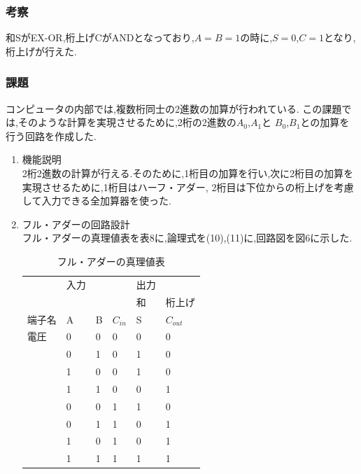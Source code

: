 \documentclass[twocolumn, 10pt,a4j]{jsarticle}
\begin{document}
  \subsubsection{考察}
    和SがEX-OR,桁上げCがANDとなっており,$A=B=1$の時に,$S=0$,$C=1$となり,
    桁上げが行えた.
  \subsubsection{課題}
    コンピュータの内部では,複数桁同士の2進数の加算が行われている.
    この課題では,そのような計算を実現させるために,2桁の2進数の$A_{0}$,$A_{1}$と
    $B_{0}$,$B_{1}$との加算を行う回路を作成した.
    \begin{enumerate}
    \item 機能説明 \\
      2桁2進数の計算が行える.そのために,1桁目の加算を行い,次に2桁目の加算を実現させるために,1桁目はハーフ・アダー,
      2桁目は下位からの桁上げを考慮して入力できる全加算器を使った.
    \item フル・アダーの回路設計 \\
      フル・アダーの真理値表を表8に,論理式を(10),(11)に,回路図を図6に示した.
      \begin{table}[H]
        \centering
        \caption{フル・アダーの真理値表}
        \label{my-label}
        \footnotesize
        \begin{tabular}{l|lll|ll}
            & 入力 &   &          & 出力 &           \\ \cline{5-6} 
            &    &   &          & 和  & 桁上げ       \\ \hline
        端子名 & A  & B & $C_{in}$ & S  & $C_{out}$ \\ \hline
        電圧  & 0  & 0 & 0        & 0  & 0         \\
            & 0  & 1 & 0        & 1  & 0         \\
            & 1  & 0 & 0        & 1  & 0         \\
            & 1  & 1 & 0        & 0  & 1         \\
            & 0  & 0 & 1        & 1  & 0         \\
            & 0  & 1 & 1        & 0  & 1         \\
            & 1  & 0 & 1        & 0  & 1         \\
            & 1  & 1 & 1        & 1  & 1        
        \end{tabular}
      \end{table}

\end{enumerate}
\end{document}
